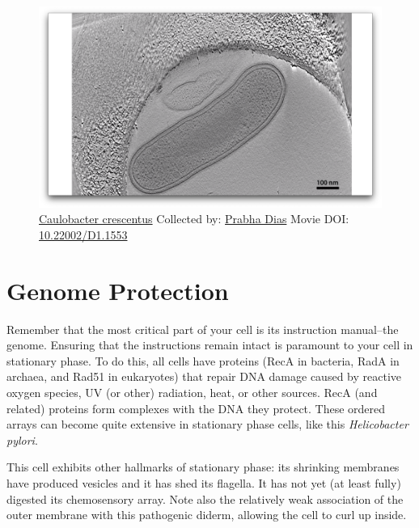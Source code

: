 \documentclass[]{tufte-book}
\begin{document}
\begin{figure}
\includegraphics{movie_stills/8_1} \caption[\protect\hyperlink{tree}{Caulobacter crescentus} Collected by:
\protect\hyperlink{prabha_dias}{Prabha Dias} Movie DOI:
\href{https://doi.org/10.22002/D1.1553}{10.22002/D1.1553}]{\protect\hyperlink{tree}{Caulobacter crescentus} Collected by:
\protect\hyperlink{prabha_dias}{Prabha Dias} Movie DOI:
\href{https://doi.org/10.22002/D1.1553}{10.22002/D1.1553}}\label{fig:8-1}
\end{figure}

\section{Genome Protection}\label{genome-protection}

Remember that the most critical part of your cell is its instruction
manual--the genome. Ensuring that the instructions remain intact is
paramount to your cell in stationary phase. To do this, all cells have
proteins (RecA in bacteria, RadA in archaea, and Rad51 in eukaryotes)
that repair DNA damage caused by reactive oxygen species, UV (or other)
radiation, heat, or other sources. RecA (and related) proteins form
complexes with the DNA they protect. These ordered arrays can become
quite extensive in stationary phase cells, like this \emph{Helicobacter
pylori}.

This cell exhibits other hallmarks of stationary phase: its shrinking
membranes have produced vesicles and it has shed its flagella. It has
not yet (at least fully) digested its chemosensory array. Note also the
relatively weak association of the outer membrane with this pathogenic
diderm, allowing the cell to curl up inside.
\end{document}
